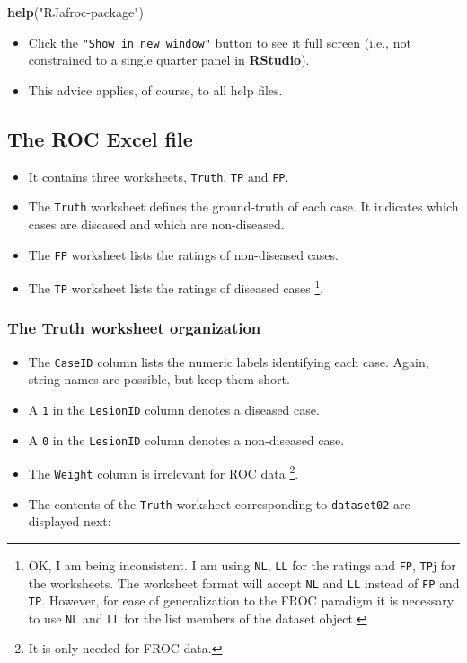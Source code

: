 \documentclass[]{book}
\newenvironment{Shaded}{\begin{snugshade}}{\end{snugshade}}
\newcommand{\KeywordTok}[1]{\textcolor[rgb]{0.13,0.29,0.53}{\textbf{#1}}}
\newcommand{\NormalTok}[1]{#1}
\newcommand{\StringTok}[1]{\textcolor[rgb]{0.31,0.60,0.02}{#1}}
\providecommand{\tightlist}{%
  \setlength{\itemsep}{0pt}\setlength{\parskip}{0pt}}
\let\rmarkdownfootnote\footnote%
\def\footnote{\protect\rmarkdownfootnote}
\begin{document}
\begin{Shaded}
\begin{Highlighting}[]
\KeywordTok{help}\NormalTok{(}\StringTok{"RJafroc-package"}\NormalTok{)}
\end{Highlighting}
\end{Shaded}

\begin{itemize}
\tightlist
\item
  Click the \texttt{"Show\ in\ new\ window"} button to see it full screen (i.e., not constrained to a single quarter panel in \textbf{RStudio}).
\item
  This advice applies, of course, to all help files.
\end{itemize}

\hypertarget{the-roc-excel-file}{%
\subsection{The ROC Excel file}\label{the-roc-excel-file}}

\begin{itemize}
\tightlist
\item
  It contains three worksheets, \texttt{Truth}, \texttt{TP} and \texttt{FP}.
\item
  The \texttt{Truth} worksheet defines the ground-truth of each case. It indicates which cases are diseased and which are non-diseased.
\item
  The \texttt{FP} worksheet lists the ratings of non-diseased cases.
\item
  The \texttt{TP} worksheet lists the ratings of diseased cases \footnote{OK, I am being inconsistent. I am using \texttt{NL}, \texttt{LL} for the ratings and \texttt{FP}, \texttt{TP}j for the worksheets. The worksheet format will accept \texttt{NL} and \texttt{LL} instead of \texttt{FP} and \texttt{TP}. However, for ease of generalization to the FROC paradigm it is necessary to use \texttt{NL} and \texttt{LL} for the list members of the dataset object.}.
\end{itemize}

\hypertarget{the-truth-worksheet-organization}{%
\subsubsection{The Truth worksheet organization}\label{the-truth-worksheet-organization}}

\begin{itemize}
\tightlist
\item
  The \texttt{CaseID} column lists the numeric labels identifying each case. Again, string names are possible, but keep them short.
\item
  A \texttt{1} in the \texttt{LesionID} column denotes a diseased case.
\item
  A \texttt{0} in the \texttt{LesionID} column denotes a non-diseased case.
\item
  The \texttt{Weight} column is irrelevant for ROC data \footnote{It is only needed for FROC data.}.
\item
  The contents of the \texttt{Truth} worksheet corresponding to \texttt{dataset02} are displayed next:
\end{itemize}
\end{document}
